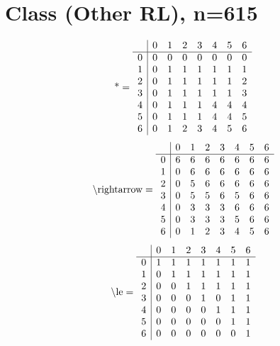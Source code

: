 \documentclass[11pt]{article}
\begin{document}
\section{Class (Other RL), n=615}
\[\text{*} = 
\begin{array}{r | r r r r r r r}
 & 0 & 1 & 2 & 3 & 4 & 5 & 6 \\ \hline
0 & 0 & 0 & 0 & 0 & 0 & 0 & 0 \\
1 & 0 & 1 & 1 & 1 & 1 & 1 & 1 \\
2 & 0 & 1 & 1 & 1 & 1 & 1 & 2 \\
3 & 0 & 1 & 1 & 1 & 1 & 1 & 3 \\
4 & 0 & 1 & 1 & 1 & 4 & 4 & 4 \\
5 & 0 & 1 & 1 & 1 & 4 & 4 & 5 \\
6 & 0 & 1 & 2 & 3 & 4 & 5 & 6 \\
\end{array}
\]
\[\text{\textbackslash rightarrow} = 
\begin{array}{r | r r r r r r r}
 & 0 & 1 & 2 & 3 & 4 & 5 & 6 \\ \hline
0 & 6 & 6 & 6 & 6 & 6 & 6 & 6 \\
1 & 0 & 6 & 6 & 6 & 6 & 6 & 6 \\
2 & 0 & 5 & 6 & 6 & 6 & 6 & 6 \\
3 & 0 & 5 & 5 & 6 & 5 & 6 & 6 \\
4 & 0 & 3 & 3 & 3 & 6 & 6 & 6 \\
5 & 0 & 3 & 3 & 3 & 5 & 6 & 6 \\
6 & 0 & 1 & 2 & 3 & 4 & 5 & 6 \\
\end{array}
\]
\[\text{\textbackslash le} = 
\begin{array}{r | r r r r r r r}
 & 0 & 1 & 2 & 3 & 4 & 5 & 6 \\ \hline
0 & 1 & 1 & 1 & 1 & 1 & 1 & 1 \\
1 & 0 & 1 & 1 & 1 & 1 & 1 & 1 \\
2 & 0 & 0 & 1 & 1 & 1 & 1 & 1 \\
3 & 0 & 0 & 0 & 1 & 0 & 1 & 1 \\
4 & 0 & 0 & 0 & 0 & 1 & 1 & 1 \\
5 & 0 & 0 & 0 & 0 & 0 & 1 & 1 \\
6 & 0 & 0 & 0 & 0 & 0 & 0 & 1 \\
\end{array}
\]
\end{document}
